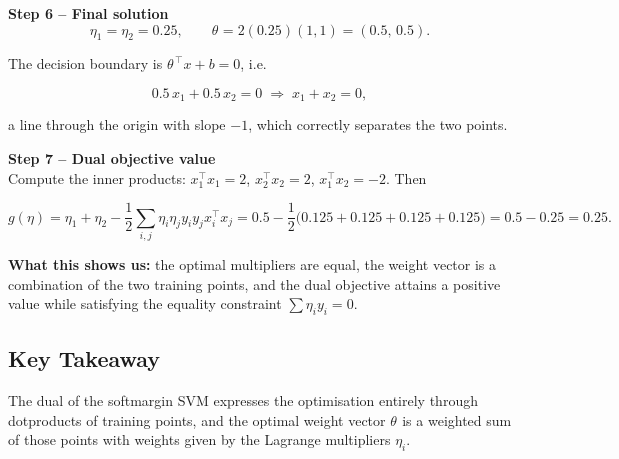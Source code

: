 \documentclass[12pt, a4paper]{article}
\begin{document}
\textbf{Step 6 -- Final solution}\\
\[
\eta_{1}=\eta_{2}=0.25,\qquad
\theta^{}=2(0.25)(1,1)=(0.5,\,0.5).
\]

The decision boundary is $\theta^{\,\top}x+b=0$, i.e.  

\[
0.5\,x_{1}+0.5\,x_{2}=0\;\Longrightarrow\;x_{1}+x_{2}=0,
\]

a line through the origin with slope $-1$, which correctly separates the two points.

\textbf{Step 7 -- Dual objective value}\\
Compute the inner products: $x_{1}^{\!\top}x_{1}=2$, $x_{2}^{\!\top}x_{2}=2$, $x_{1}^{\!\top}x_{2}=-2$.  
Then  

\[
g(\eta)=\eta_{1}+\eta_{2}
-\frac12\!\sum_{i,j}\eta_{i}\eta_{j}y_{i}y_{j}x_{i}^{\!\top}x_{j}
=0.5-\frac12\bigl(0.125+0.125+0.125+0.125\bigr)
=0.5-0.25=0.25 .
\]

\textbf{What this shows us:} the optimal multipliers are equal, the weight vector is a combination of the two training points, and the dual objective attains a positive value while satisfying the equality constraint $\sum\eta_i y_i=0$.

\subsection{Key Takeaway}
The dual of the softmargin SVM expresses the optimisation entirely through dotproducts of training points, and the optimal weight vector $\theta^{}$ is a weighted sum of those points with weights given by the Lagrange multipliers $\eta_i$.
\end{document}
